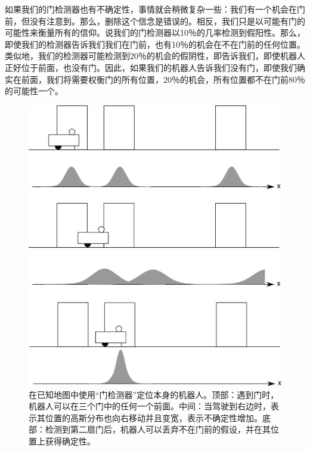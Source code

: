 如果我们的门检测器也有不确定性，事情就会稍微复杂一些：我们有一个机会在门前，但没有注意到。那么，删除这个信念是错误的。相反，我们只是以可能有门的可能性来衡量所有的信仰。说我们的门检测器以10％的几率检测到假阳性。那么，即使我们的检测器告诉我们我们在门前，也有10％的机会在不在门前的任何位置。类似地，我们的检测器可能检测到20％的机会的假阴性，即告诉我们，即使机器人正好位于前面，也没有门。因此，如果我们的机器人告诉我们没有门，即使我们确实在前面，我们将需要权衡门的所有位置，20％的机会，所有位置都不在门前80％的可能性一个。

\begin{figure}
	\centering
		\includegraphics[width=\textwidth]{figs/three_door_example}
	\caption{在已知地图中使用“门检测器”定位本身的机器人。顶部：遇到门时，机器人可以在三个门中的任何一个前面。中间：当驾驶到右边时，表示其位置的高斯分布也向右移动并且变宽，表示不确定性增加。底部：检测到第二扇门后，机器人可以丢弃不在门前的假设，并在其位置上获得确定性。}
	\label{fig:three_door_example}
\end{figure}

